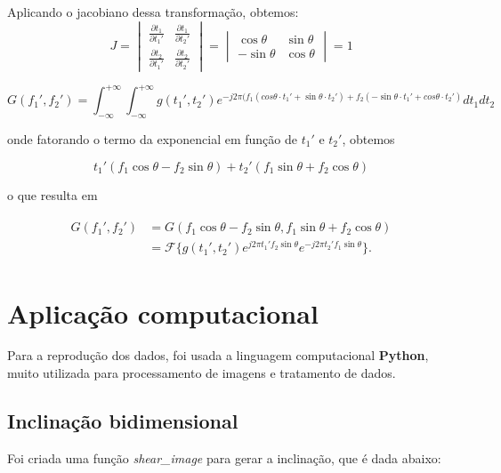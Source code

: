 Aplicando o jacobiano dessa transformação, obtemos:
\[
J = 
\begin{vmatrix}
\frac{\partial t_1}{\partial t_1'} & \frac{\partial t_1}{\partial t_2'} \\
\frac{\partial t_2}{\partial t_1'} & \frac{\partial t_2}{\partial t_2'}
\end{vmatrix}
=
\begin{vmatrix}
\cos\theta & \sin\theta \\
-\sin\theta & \cos\theta
\end{vmatrix}
= 1
\]


\begin{equation*}
    G(f_1',f_2') = \int_{-\infty}^{+\infty} \int_{-\infty}^{+\infty} {g(t_1',t_2')e^{-j2\pi (f_1(cos\theta \cdot t_1' + \sin\theta \cdot t_2')+f_2(-\sin\theta \cdot t_1' + cos\theta \cdot t_2')}}dt_1dt_2 
\end{equation*}

\noindent
onde fatorando o termo da exponencial em função de $t_1'$ e $t_2'$, obtemos

\begin{equation*}
    t_1'(f_1\cos\theta - f_2\sin\theta) + t_2'(f_1\sin\theta + f_2\cos\theta)
\end{equation*}

\noindent
o que resulta em

\begin{align}
\begin{split}
  G(f_1',f_2') &= G(f_1\cos\theta - f_2\sin\theta, f_1\sin\theta + f_2\cos\theta) \\
  &= \mathcal{F}\{g(t_1', t_2')e^{j2\pi t_1'f_2\sin\theta}e^{-j2\pi t_2'f_1\sin\theta}\}.
\end{split}
\end{align}


\section{Aplicação computacional}

Para a reprodução dos dados, foi usada a linguagem computacional \textbf{Python}, muito utilizada para processamento de imagens e tratamento de dados.

\subsection{Inclinação bidimensional}

Foi criada uma função \textit{shear\_image} para gerar a inclinação, que é dada abaixo:

